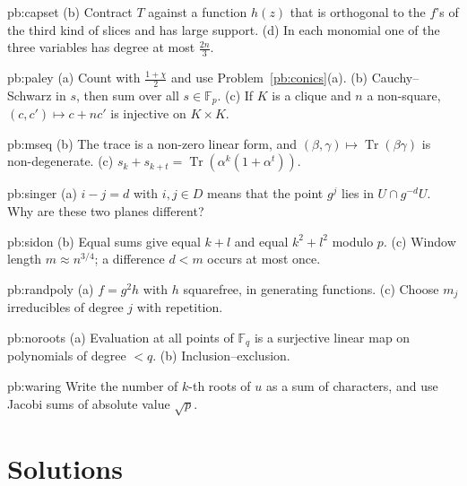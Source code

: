 \begin{hint}{pb:capset}
(b) Contract $T$ against a function $h(z)$ that is orthogonal to the $f$'s of the third kind of slices and has large support.
(d) In each monomial one of the three variables has degree at most $\frac{2n}3$.
\end{hint}

\begin{hint}{pb:paley}
(a) Count with $\frac{1+\chi}2$ and use Problem~\ref{pb:conics}(a). (b) Cauchy--Schwarz in $s$, then sum over all $s\in\mathbb F_p$.
(c) If $K$ is a clique and $n$ a non-square, $(c,c')\mapsto c+nc'$ is injective on $K\times K$.
\end{hint}

\begin{hint}{pb:mseq}
(b) The trace is a non-zero linear form, and $(\beta,\gamma)\mapsto\operatorname{Tr}(\beta\gamma)$ is non-degenerate.
(c) $s_k+s_{k+t}=\operatorname{Tr}(\alpha^k(1+\alpha^t))$.
\end{hint}

\begin{hint}{pb:singer}
(a) $i-j=d$ with $i,j\in D$ means that the point $g^j$ lies in $U\cap g^{-d}U$. Why are these two planes different?
\end{hint}

\begin{hint}{pb:sidon}
(b) Equal sums give equal $k+l$ and equal $k^2+l^2$ modulo $p$. (c) Window length $m\approx n^{3/4}$; a difference $d<m$ occurs at
most once.
\end{hint}

\begin{hint}{pb:randpoly}
(a) $f=g^2h$ with $h$ squarefree, in generating functions. (c) Choose $m_j$ irreducibles of degree $j$ with repetition.
\end{hint}

\begin{hint}{pb:noroots}
(a) Evaluation at all points of $\mathbb F_q$ is a surjective linear map on polynomials of degree $<q$. (b) Inclusion--exclusion.
\end{hint}

\begin{hint}{pb:waring}
Write the number of $k$-th roots of $u$ as a sum of characters, and use Jacobi sums of absolute value $\sqrt p$.
\end{hint}

\section{Solutions}

